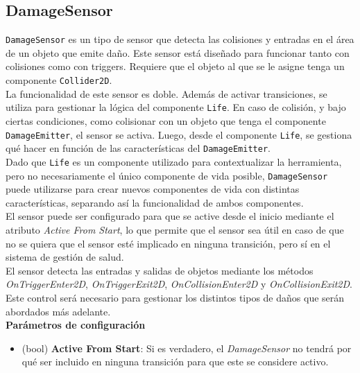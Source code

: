 \subsection{DamageSensor}

\texttt{DamageSensor} es un tipo de sensor que detecta las colisiones y entradas en el área de un objeto que emite daño. Este sensor está diseñado para funcionar tanto con colisiones como con triggers. Requiere que el objeto al que se le asigne tenga un componente \texttt{Collider2D}.\\

La funcionalidad de este sensor es doble. Además de activar transiciones, se utiliza para gestionar la lógica del componente \texttt{Life}. En caso de colisión, y bajo ciertas condiciones, como colisionar con un objeto que tenga el componente \texttt{DamageEmitter}, el sensor se activa. Luego, desde el componente \texttt{Life}, se gestiona qué hacer en función de las características del \texttt{DamageEmitter}.\\

Dado que \texttt{Life} es un componente utilizado para contextualizar la herramienta, pero no necesariamente el único componente de vida posible, \texttt{DamageSensor} puede utilizarse para crear nuevos componentes de vida con distintas características, separando así la funcionalidad de ambos componentes.\\

El sensor puede ser configurado para que se active desde el inicio mediante el atributo \textit{Active From Start}, lo que permite que el sensor sea útil en caso de que no se quiera que el sensor esté implicado en ninguna transición, pero sí en el sistema de gestión de salud.\\

El sensor detecta las entradas y salidas de objetos mediante los métodos \textit{OnTriggerEnter2D}, \textit{OnTriggerExit2D}, \textit{OnCollisionEnter2D} y \textit{OnCollisionExit2D}. Este control será necesario para gestionar los distintos tipos de daños que serán abordados más adelante.\\

\textbf{Parámetros de configuración}
\begin{itemize}
	\item (bool) \textbf{Active From Start}: Si es verdadero, el \textit{DamageSensor} no tendrá por qué ser incluido en ninguna transición para que este se considere activo.
\end{itemize}

